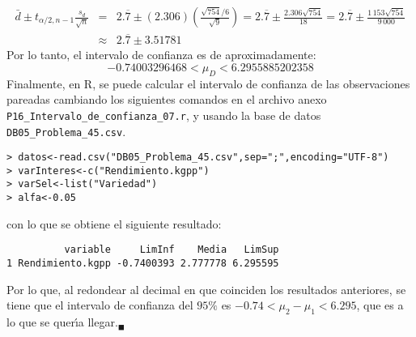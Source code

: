 \begin{solucion}
\begin{eqnarray*}
  \bar{d} \pm t_{\alpha/2,n-1} \frac{s_d}{\sqrt{n}} & = & 2.\overline{7} \pm (2.306)\left( \frac{\sqrt{754}/6}{\sqrt{9}} \right) = 2.\overline{7} \pm \frac{2.306\sqrt{754}}{18} = 2.\overline{7} \pm \frac{1\,153\sqrt{754}}{9\,000} \\
  & \approx & 2.\overline{7} \pm  3.51781
 \end{eqnarray*}
 Por lo tanto, el intervalo de confianza es de aproximadamente:
 \begin{equation*}
  -0.74003296468 < \mu_D < 6.2955885202358
 \end{equation*}
 Finalmente, en R, se puede calcular el intervalo de confianza de las observaciones pareadas cambiando los siguientes comandos en el archivo anexo \texttt{P16\_Intervalo\_de\_confianza\_07.r}, y usando la base de datos \texttt{DB05\_Problema\_45.csv}.
 \begin{verbatim}
> datos<-read.csv("DB05_Problema_45.csv",sep=";",encoding="UTF-8")
> varInteres<-c("Rendimiento.kgpp")
> varSel<-list("Variedad")
> alfa<-0.05
 \end{verbatim}
 \vspace{-0.5cm}
 con lo que se obtiene el siguiente resultado:
 \begin{verbatim}
          variable     LimInf    Media   LimSup
1 Rendimiento.kgpp -0.7400393 2.777778 6.295595
 \end{verbatim}
 \vspace{-0.5cm}
 Por lo que, al redondear al decimal en que coinciden los resultados anteriores, se tiene que el intervalo de confianza del $95\%$ es $-0.74 < \mu_2 - \mu_1  < 6.295$, que es a lo que se quer\'{\i}a llegar.${}_{\blacksquare}$
\end{solucion}
